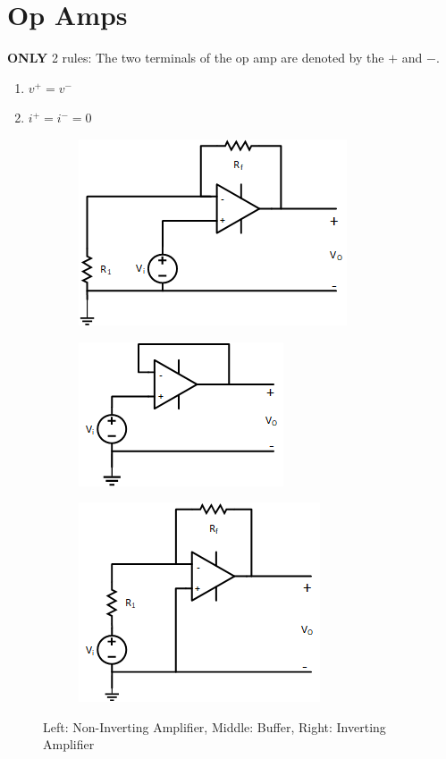 \documentclass[10pt,letterpaper,final,twoside,notitlepage]{article}
\begin{document}
\section*{Op Amps}
	\textbf{ONLY} 2 rules: \newline
	The two terminals of the op amp are denoted by the $+$ and $-$.
	\begin{enumerate}
		\item $v^{+}=v^{-}$
		\item $i^{+}=i^{-}=0$
	\end{enumerate}
	\vspace{3mm} %
	
	\begin{figure}[ht]
		\begin{subfigure}
			\centering
			\includegraphics[scale=.7]{NonInvertingAmp.png}
			\label{fig:Non-Inverting Amplifier}
		\end{subfigure}
		\begin{subfigure}
			\centering
			\includegraphics[scale=.7]{Buffer.png}
			\label{fig:Buffer}
		\end{subfigure}
		\hspace{5mm}
		\begin{subfigure}
			\centering
			\includegraphics[scale=.7]{InvertingAmp.png}
			\label{fig:Inverting Amplifier}
		\end{subfigure}
		\caption{Left: Non-Inverting Amplifier, Middle: Buffer, Right: Inverting Amplifier}
	\end{figure}
\end{document}
